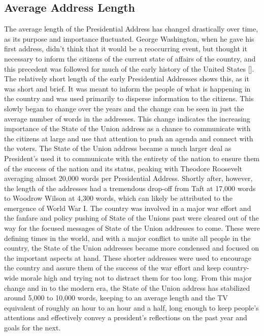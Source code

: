 \subsection{Average Address Length}
The average length of the Presidential Address has changed drastically over time, as its purpose and importance fluctuated.
George Washington, when he gave his first address, didn't think that it would be a reoccurring event, but thought it necessary to inform the citizens of the current state of affairs of the country, and this precedent was followed for much of the early history of the United States [\cite{freeman1948george}].
The relatively short length of the early Presidential Addresses shows this, as it was short and brief.
It was meant to inform the people of what is happening in the country and was used primarily to disperse information to the citizens.
This slowly began to change over the years and the change can be seen in just the average number of words in the addresses.
This change indicates the increasing importance of the State of the Union address as a chance to communicate with the citizens at large and use that attention to push an agenda and connect with the voters.
The State of the Union address became a much larger deal as President's used it to communicate with the entirety of the nation to ensure them of the success of the nation and its status, peaking with Theodore Roosevelt averaging almost 20,000 words per Presidential Address.
Shortly after, however, the length of the addresses had a tremendous drop-off from Taft at 17,000 words to Woodrow Wilson at 4,300 words, which can likely be attributed to the emergence of World War I.
The country was involved in a major war effort and the fanfare and policy pushing of State of the Unions past were cleared out of the way for the focused messages of State of the Union addresses to come.
These were defining times in the world, and with a major conflict to unite all people in the country, the State of the Union addresses became more condensed and focused on the important aspects at hand.
These shorter addresses were used to encourage the country and assure them of the success of the war effort and keep country-wide morale high and trying not to distract them for too long.
From this major change and in to the modern era, the State of the Union address has stabilized around 5,000 to 10,000 words, keeping to an average length and the TV equivalent of roughly an hour to an hour and a half, long enough to keep people's attentions and effectively convey a president's reflections on the past year and goals for the next.

